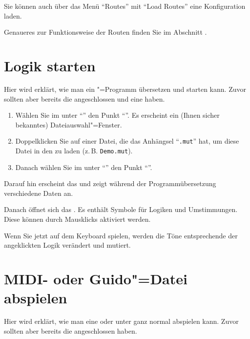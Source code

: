 Sie können auch über das Menü "`Routes"' mit "`Load Routes"' eine
Konfiguration laden.

Genaueres zur Funktionsweise der Routen finden Sie im Abschnitt
.


\section{Logik  starten}
\label{sec:CC_LOGIC}

Hier wird erklärt, wie man ein \mutabor{}"=Programm übersetzen 
und starten kann. Zuvor sollten aber bereits die 
angeschlossen und eine  haben.

\begin{enumerate}
\item Wählen Sie im  unter
  "`"' den Punkt "`"'. Es
  erscheint ein (Ihnen sicher bekanntes) Dateiauswahl"=Fenster.
\item Doppelklicken Sie auf einer Datei, die das Anhängsel
  "`\texttt{.mut}"' hat, um diese Datei in den
   zu laden (z.\,B.
  \texttt{Demo.mut}).
\item Danach wählen Sie im  unter
  "`"' den Punkt
  "`"'.
\end{enumerate}

Darauf hin erscheint das  und
zeigt während der Programmübersetzung verschiedene Daten an.

Danach öffnet sich das . Es enthält 
Symbole für Logiken und Umstimmungen. Diese können durch 
Mausklicks aktiviert werden.

Wenn Sie jetzt auf dem Keyboard spielen, werden die Töne entsprechende 
der angeklickten Logik verändert und mutiert.

\section{MIDI- oder Guido"=Datei abspielen}
\label{sec:CC_MIDIIN}


Hier wird erklärt, wie man eine 
oder  unter \mutabor{} ganz normal 
abspielen kann. Zuvor sollten aber bereits die  
angeschlossen haben.


